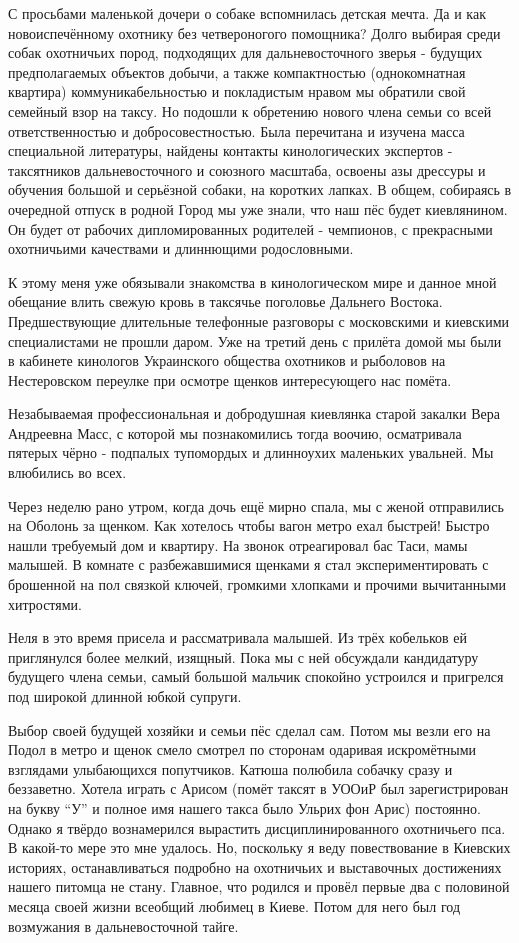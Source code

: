 С просьбами маленькой дочери о собаке вспомнилась детская мечта. Да и как
новоиспечённому охотнику без четвероногого помощника? Долго выбирая среди собак
охотничьих пород, подходящих для дальневосточного зверья - будущих
предполагаемых объектов добычи, а также компактностью (однокомнатная квартира)
коммуникабельностью и покладистым нравом мы обратили свой семейный взор на
таксу. Но подошли к обретению нового члена семьи со всей ответственностью и
добросовестностью. Была перечитана и изучена масса специальной литературы,
найдены контакты кинологических экспертов - таксятников дальневосточного и
союзного масштаба, освоены азы дрессуры и обучения большой и серьёзной собаки,
на коротких лапках.  В общем, собираясь в очередной отпуск в родной Город мы
уже знали, что наш пёс будет киевлянином. Он будет от рабочих дипломированных
родителей - чемпионов, с прекрасными охотничьими качествами и длиннющими
родословными. 

К этому меня уже
обязывали знакомства в кинологическом мире и данное мной обещание влить свежую
кровь в таксячье поголовье Дальнего Востока. Предшествующие длительные
телефонные разговоры с московскими и киевскими специалистами не прошли даром.
Уже на третий день с прилёта домой мы были в кабинете кинологов Украинского
общества охотников и рыболовов на Нестеровском переулке при осмотре щенков
интересующего нас помёта. 

Незабываемая профессиональная и добродушная киевлянка старой закалки Вера
Андреевна Масс, с которой мы познакомились тогда воочию, осматривала пятерых
чёрно - подпалых тупомордых и длинноухих маленьких увальней. Мы влюбились во
всех. 

Через неделю рано утром, когда дочь ещё мирно спала, мы с женой отправились на
Оболонь за щенком. Как хотелось чтобы вагон метро ехал быстрей! Быстро нашли
требуемый дом и квартиру. На звонок отреагировал бас Таси, мамы малышей. В
комнате с разбежавшимися щенками я стал экспериментировать с брошенной на пол
связкой ключей, громкими хлопками и прочими вычитанными хитростями. 

Неля в это время присела и рассматривала малышей. Из трёх кобельков ей
приглянулся более мелкий, изящный. Пока мы с ней обсуждали кандидатуру будущего
члена семьи, самый большой мальчик спокойно устроился и пригрелся под широкой
длинной юбкой супруги. 

Выбор своей будущей хозяйки и семьи пёс сделал сам. Потом мы везли его на Подол
в метро и щенок смело смотрел по сторонам одаривая искромётными взглядами
улыбающихся попутчиков. Катюша полюбила собачку сразу и беззаветно. Хотела
играть с Арисом (помёт таксят в УООиР был зарегистрирован на букву \enquote{У}
и полное имя нашего такса было Ульрих фон Арис) постоянно. Однако я твёрдо
вознамерился вырастить дисциплинированного охотничьего пса. В какой-то мере это
мне удалось. Но, поскольку я веду повествование в Киевских историях,
останавливаться подробно на охотничьих и выставочных достижениях нашего питомца
не стану. Главное, что родился и провёл первые два с половиной месяца своей
жизни всеобщий любимец в Киеве. Потом для него был год возмужания в
дальневосточной тайге. 

